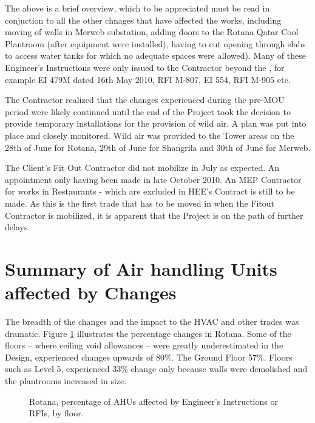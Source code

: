 The above is a brief overview, which to be appreciated must be read in conjuction to all the other chnages that have affected the works, including moving of walls in Merweb substation, adding doors to the Rotana Qatar Cool Plantroom (after equipment were installed), having to cut opening through slabs to access water tanks for which no adequate spaces were allowed). Many of these Engineer's Instructions were only issued to the Contractor beyond the \deadline, for example EI 479M dated 16th May 2010, RFI M-807, EI 554, RFI M-905 etc.

The Contractor realized that the changes experienced during the pre-MOU period were likely continued until the end of the Project took the decision to provide temporary installations for the provision of wild air. A plan was put into place and closely monitored. Wild air was provided to the Tower areas on the 28th of June for Rotana, 29th of June for Shangrila and 30th of June for Merweb.

The Client's Fit Out Contractor did not mobilize in July as expected. An appointment only having been made in late October 2010. An MEP Contractor for works in Restaurants - which are excluded in HEE's Contract is still to be made. As this is the first trade that has to be moved in when the Fitout Contractor is mobilized, it is apparent that the Project is on the path of further delays.



\section{Summary of Air handling Units affected by Changes}

The breadth of the changes and the impact to the HVAC and other trades was dramatic. Figure \ref{fig:RotanaAHUs} illustrates the percentage changes in Rotana. Some of the floors -- where ceiling void allowances -- were greatly underestimated in the Design, experienced changes upwards of 80\%. The Ground Floor 57\%. Floors such as Level 5, experienced 33\% change only because walls were demolished and the plantrooms increased in size.

\begin{figure}[htbp]
\centering
{}
\caption{Rotana, percentage of AHUs affected by Engineer's 
Instructions or RFIs, by floor.}
\label{fig:RotanaAHUs}
\end{figure}

